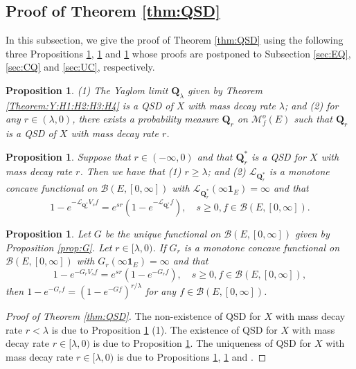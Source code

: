 \documentclass[12pt,a4paper]{amsart}
\numberwithin{equation}{section}
\theoremstyle{plain}
\newtheorem{prop}[thm]{Proposition}
\theoremstyle{definition}
\theoremstyle{remark}
\begin{document}
\subsection{Proof of Theorem \ref{thm:QSD}} \label{subsec:QSD}
	In this subsection,
	we give the proof of Theorem \ref{thm:QSD} using the following three
Propositions \ref{prop:EQ}, \ref{prop:CQ} and \ref{prop:UC}  whose proofs are postponed to
Subsection \ref{sec:EQ}, \ref{sec:CQ} and \ref{sec:UC}, respectively.

\begin{prop} \label{prop:EQ}
	(1) The Yaglom limit $\mathbf Q_\lambda$ given by Theorem \ref{Theorem:Y:H1:H2:H3:H4} is a QSD of $X$ with mass decay rate $\lambda$; and
	(2) for any $r \in (\lambda , 0)$,
	there exists a probability measure $\mathbf Q_r$  on $\mathcal M^o_f(E)$
such that  $\mathbf Q_r$ is a QSD of $X$ with mass decay rate $r$.
\end{prop}


\begin{prop} \label{prop:CQ}
	Suppose that $r \in (-\infty, 0)$ and that  $\mathbf Q^*_{r}$
	is a QSD
	for $X$ with mass decay rate $r$.
	Then we have that (1) $r \geq \lambda$; and
	(2) $\mathscr L_{\mathbf Q^*_r}$ is a monotone concave functional on $\mathcal B(E,[0,\infty])$
	with $\mathscr L_{\mathbf Q^*_r}(\infty \mathbf 1_E) = \infty$ and that
\[
	1 - e^{- \mathscr L_{\mathbf Q^*_r} V_s f}
	= e^{sr}(1- e^{- \mathscr L_{\mathbf Q^*_r} f}),
	\quad s\geq 0, f\in \mathcal B(E,[0,\infty]).
\]
\end{prop}

\begin{prop} \label{prop:UC}
	Let $G$ be the unique functional on $\mathcal B(E,[0,\infty])$ given by Proposition \ref{prop:G}.
	Let $r \in [\lambda, 0)$.
	If $G_r$ is a monotone concave functional on $\mathcal B(E,[0,\infty])$ with
	$G_r(\infty \mathbf 1_E) = \infty$ and that
\[
	1 - e^{-G_r V_s f}
	= e^{sr }(1- e^{- G_r f}),
	\quad s\geq 0, f\in \mathcal B(E,[0,\infty]),
\]
then $1 - e^{-G_rf} = (1 - e^{- G f})^{r/\lambda}$ for any $f\in \mathcal B(E,[0,\infty])$.
\end{prop}

\begin{proof}[Proof of Theorem \ref{thm:QSD}]
	The non-existence of QSD for $X$ with mass decay rate $r < \lambda$ is due to Proposition \ref{prop:CQ} (1).
	The existence of QSD for $X$ with mass decay rate $r \in [\lambda,0)$ is due to Proposition \ref{prop:EQ}.
	The uniqueness of QSD for $X$ with mass decay rate $r\in [\lambda , 0)$ is due to Propositions \ref{prop:CQ}, \ref{prop:UC} and \cite[Theorem 1.17]{Li2011MeasureValued}.
\end{proof}
\end{document}
